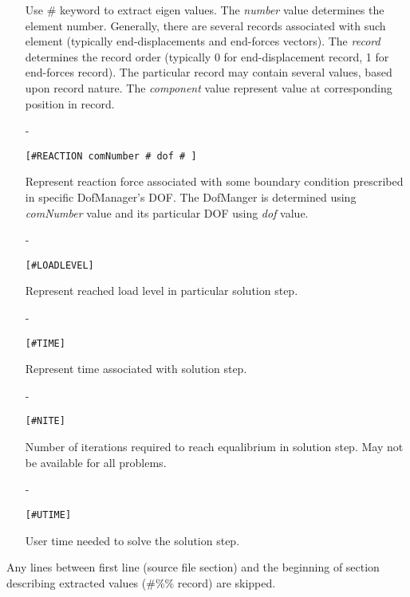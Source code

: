 \begin{itemize}
Use \# keyword  to extract eigen
values. The {\em number} value determines the element number.
Generally, there are several records associated with such element
(typically end-displacements  and end-forces vectors). 
The {\em record} determines the record order (typically 0 for end-displacement record, 1 for end-forces
record). The particular record may contain several values, based upon
record nature. The {\em  component} value represent value at corresponding position
in record. 
\item[-]
\begin{verbatim}
[#REACTION comNumber # dof # ]
\end{verbatim}
Represent reaction force associated with some boundary condition
prescribed in specific DofManager's DOF. The DofManger is determined
using {\em comNumber} value and its particular DOF using {\em dof} value.
\item[-]
\begin{verbatim}
[#LOADLEVEL]
\end{verbatim}
Represent reached load level in particular solution step.
\item[-]
\begin{verbatim}
[#TIME]
\end{verbatim}
Represent time associated with solution step.
\item[-]
\begin{verbatim}
[#NITE]
\end{verbatim}
Number of iterations required to reach equalibrium in solution
step. May not be available for all problems.
\item[-]
\begin{verbatim}
[#UTIME]
\end{verbatim}
User time needed to solve the solution step. 
\end{itemize}
Any lines between first line (source file section) and the beginning
of section describing extracted values (\#\%\% record) are
skipped. 

